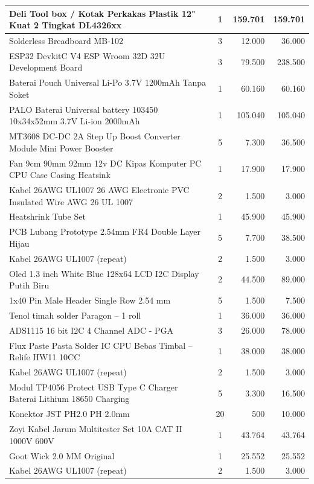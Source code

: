 \documentclass[12pt,a4paper]{article}
\begin{document}
\begin{longtable}{|p{8cm}|c|r|r|}
Deli Tool box / Kotak Perkakas Plastik 12" Kuat 2 Tingkat DL4326xx & 1 & 159.701 & 159.701 \\ \hline
Solderless Breadboard MB-102 & 3 & 12.000 & 36.000 \\ \hline
ESP32 DevkitC V4 ESP Wroom 32D 32U Development Board & 3 & 79.500 & 238.500 \\ \hline
Baterai Pouch Universal Li-Po 3.7V 1200mAh Tanpa Soket & 1 & 60.160 & 60.160 \\ \hline
PALO Baterai Universal battery 103450 10x34x52mm 3.7V Li-ion 2000mAh & 1 & 105.040 & 105.040 \\ \hline
MT3608 DC-DC 2A Step Up Boost Converter Module Mini Power Booster & 5 & 7.300 & 36.500 \\ \hline
Fan 9cm 90mm 92mm 12v DC Kipas Komputer PC CPU Case Casing Heatsink & 1 & 17.900 & 17.900 \\ \hline
Kabel 26AWG UL1007 26 AWG Electronic PVC Insulated Wire AWG 26 UL 1007 & 2 & 1.500 & 3.000 \\ \hline
Heatshrink Tube Set & 1 & 45.900 & 45.900 \\ \hline
PCB Lubang Prototype 2.54mm FR4 Double Layer Hijau & 5 & 7.700 & 38.500 \\ \hline
Kabel 26AWG UL1007 (repeat) & 2 & 1.500 & 3.000 \\ \hline
Oled 1.3 inch White Blue 128x64 LCD I2C Display Putih Biru & 2 & 44.500 & 89.000 \\ \hline
1x40 Pin Male Header Single Row 2.54 mm & 5 & 1.500 & 7.500 \\ \hline
Tenol timah solder Paragon -- 1 roll & 1 & 36.000 & 36.000 \\ \hline
ADS1115 16 bit I2C 4 Channel ADC - PGA & 3 & 26.000 & 78.000 \\ \hline
Flux Paste Pasta Solder IC CPU Bebas Timbal -- Relife HW11 10CC & 1 & 38.000 & 38.000 \\ \hline
Kabel 26AWG UL1007 (repeat) & 2 & 1.500 & 3.000 \\ \hline
Modul TP4056 Protect USB Type C Charger Baterai Lithium 18650 Charging & 5 & 3.300 & 16.500 \\ \hline
Konektor JST PH2.0 PH 2.0mm & 20 & 500 & 10.000 \\ \hline
Zoyi Kabel Jarum Multitester Set 10A CAT II 1000V 600V & 1 & 43.764 & 43.764 \\ \hline
Goot Wick 2.0 MM Original & 1 & 25.552 & 25.552 \\ \hline
Kabel 26AWG UL1007 (repeat) & 2 & 1.500 & 3.000 \\ \hline

\end{longtable}
\end{document}
